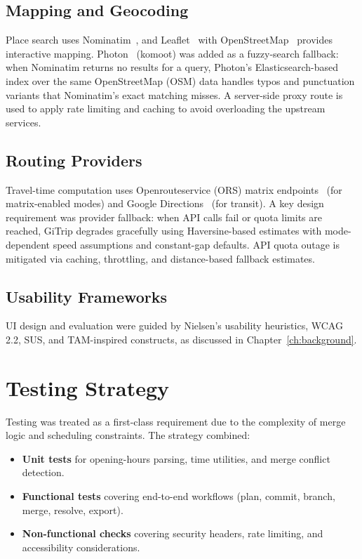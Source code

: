 \subsection{Mapping and Geocoding}
Place search uses Nominatim~\cite{ref_nominatim}, and Leaflet~\cite{ref_leaflet} with OpenStreetMap~\cite{ref_osm} provides interactive mapping.
Photon~\cite{ref_photon} (komoot) was added as a fuzzy-search fallback: when Nominatim returns no
results for a query, Photon's Elasticsearch-based index over the same OpenStreetMap (OSM) data
handles typos and punctuation variants that Nominatim's exact matching misses.
A server-side proxy route is used to apply rate limiting and caching to avoid
overloading the upstream services.

\subsection{Routing Providers}
Travel-time computation uses Openrouteservice (ORS) matrix endpoints~\cite{ref_ors_matrix} (for matrix-enabled modes) and Google Directions~\cite{ref_google_directions_api} (for transit). A key design requirement was provider fallback:
when API calls fail or quota limits are reached, GiTrip degrades gracefully
using Haversine-based estimates with mode-dependent speed assumptions and
constant-gap defaults. API quota outage is mitigated via caching, throttling, and distance-based fallback estimates.

\subsection{Usability Frameworks}
UI design and evaluation were guided by Nielsen's usability heuristics, WCAG 2.2, SUS, and TAM-inspired constructs, as discussed in Chapter~\ref{ch:background}.

\section{Testing Strategy}
Testing was treated as a first-class requirement due to the complexity of merge
logic and scheduling constraints. The strategy combined:
\begin{itemize}
  \item \textbf{Unit tests} for opening-hours parsing, time utilities, and merge
        conflict detection.
  \item \textbf{Functional tests} covering end-to-end workflows (plan, commit,
        branch, merge, resolve, export).
  \item \textbf{Non-functional checks} covering security headers, rate limiting,
        and accessibility considerations.
\end{itemize}

